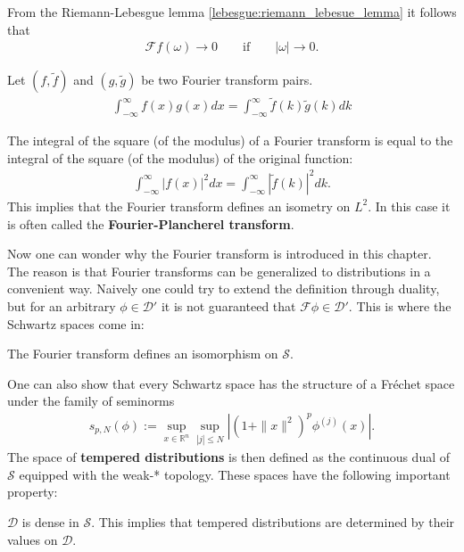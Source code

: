     \begin{property}
        From the Riemann-Lebesgue lemma \ref{lebesgue:riemann_lebesue_lemma} it follows that
        \begin{gather}
            \mathcal{F}f(\omega)\longrightarrow0\qquad\text{if}\qquad |\omega|\longrightarrow0.
        \end{gather}
    \end{property}

    \begin{theorem}[Parceval]\label{distributions:parcevals_theorem}
        Let $(f,\widetilde{f})$ and $(g,\widetilde{g})$ be two Fourier transform pairs.
        \begin{gather}
            \int_{-\infty}^\infty f(x)g(x)dx = \int_{-\infty}^\infty\widetilde{f}(k)\widetilde{g}(k)dk
        \end{gather}
    \end{theorem}
    \begin{result}[Plancherel]\label{distributions:plancherel_theorem}
        The integral of the square (of the modulus) of a Fourier transform is equal to the integral of the square (of the modulus) of the original function:
        \begin{gather}
            \int_{-\infty}^\infty|f(x)|^2dx = \int_{-\infty}^\infty|\widetilde{f}(k)|^2dk.
        \end{gather}
        This implies that the Fourier transform defines an isometry on $L^2$. In this case it is often called the \textbf{Fourier-Plancherel transform}.
    \end{result}

    Now one can wonder why the Fourier transform is introduced in this chapter. The reason is that Fourier transforms can be generalized to distributions in a convenient way. Naively one could try to extend the definition through duality, but for an arbitrary $\phi\in\mathcal{D}'$ it is not guaranteed that $\mathcal{F}\phi\in\mathcal{D}'$. This is where the Schwartz spaces come in:
    \begin{property}
        The Fourier transform defines an isomorphism on $\mathscr{S}$.
    \end{property}

    One can also show that every Schwartz space has the structure of a Fr\'echet space under the family of seminorms
    \begin{gather}
        s_{p,N}(\phi) := \sup_{x\in\mathbb{R}^n}\sup_{|j|\leq N}\left|(1+\|x\|^2)^p\phi^{(j)}(x)\right|.
    \end{gather}
    The space of \textbf{tempered distributions} is then defined as the continuous dual of $\mathscr{S}$ equipped with the weak-* topology. These spaces have the following important property:
    \begin{property}
        $\mathcal{D}$ is dense in $\mathscr{S}$. This implies that tempered distributions are determined by their values on $\mathcal{D}$.
    \end{property}

